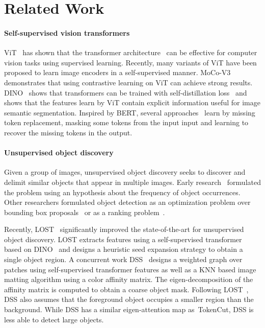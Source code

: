 \documentclass[twocolumn]{article}
\newcommand{\name} {TokenCut}
\begin{document}
\section{Related Work}
\paragraph*{Self-supervised vision transformers}

ViT~\cite{dosovitskiy2020image} has shown that the transformer architecture~\cite{vaswani2017attention} can be effective for computer vision tasks using supervised learning. Recently, many variants of ViT have been proposed to learn image encoders in a self-supervised manner. MoCo-V3~\cite{chen2021empirical} demonstrates that using contrastive learning on ViT can achieve strong results. DINO~\cite{caron2021emerging} shows that transformers can be trained with self-distillation loss~\cite{hinton2015distilling} and shows that the features learn by ViT contain explicit information useful for image semantic segmentation. Inspired by BERT, several approaches~\cite{devlin2018bert, li2021mst, bao2021beit, he2022masked} learn by missing token replacement, masking some tokens from the input input and learning to recover the missing tokens in the output.

\paragraph*{Unsupervised object discovery} 
Given a group of images, unsupervised object discovery seeks to discover and delimit similar objects that appear in multiple images.
Early research~\cite{joulin2010discriminative,joulin2012multi,vicente2011object,hsu2018co,chen2020show}  
formulated the problem using an hypothesis about the frequency of object occurrences. Other researchers formulated object detection as an optimization problem over bounding box proposals~\cite{tang2014co,cho2015unsupervised,vo2019unsupervised,vo2020toward} or as a ranking problem~\cite{vo2021large}.

Recently, LOST~\cite{simeoni2021localizing} significantly improved the state-of-the-art for unsupervised object discovery. LOST extracts features using a self-supervised transformer based on DINO~\cite{caron2021emerging} and designs a heuristic seed expansion strategy to obtain a single object region. 
A concurrent work DSS~\cite{melaskyriazi2022deep} designs a weighted graph over patches using self-supervised transformer features as well as a KNN based image matting algorithm using a color affinity matrix. The eigen-decomposition of the affinity matrix is computed to obtain a coarse object  mask. Following LOST~\cite{simeoni2021localizing}, DSS also assumes that the foreground object occupies a smaller region than the background. While DSS has a  similar eigen-attention map as~\name, DSS is less able to detect large objects.
\end{document}
